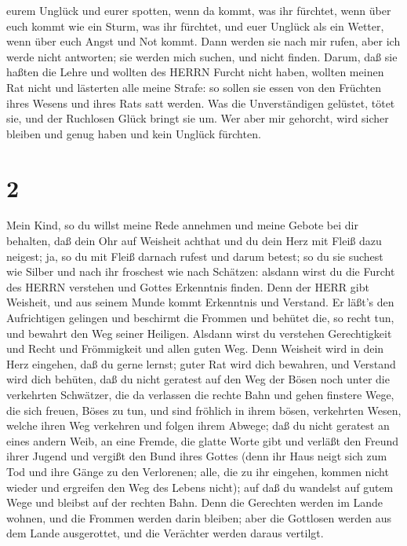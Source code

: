 eurem Unglück und eurer spotten, wenn da kommt, was ihr fürchtet,
 wenn über euch kommt wie ein Sturm, was ihr fürchtet, und
euer Unglück als ein Wetter, wenn über euch Angst und Not kommt.
 Dann werden sie nach mir rufen, aber ich werde nicht
antworten; sie werden mich suchen, und nicht finden. 
Darum, daß sie haßten die Lehre und wollten des HERRN Furcht nicht
haben,  wollten meinen Rat nicht und lästerten alle meine
Strafe:  so sollen sie essen von den Früchten ihres Wesens
und ihres Rats satt werden.  Was die Unverständigen
gelüstet, tötet sie, und der Ruchlosen Glück bringt sie um.
 Wer aber mir gehorcht, wird sicher bleiben und genug haben
und kein Unglück fürchten.

\hypertarget{section-1}{%
\section{2}\label{section-1}}

 Mein Kind, so du willst meine Rede annehmen und meine
Gebote bei dir behalten,  daß dein Ohr auf Weisheit achthat
und du dein Herz mit Fleiß dazu neigest;  ja, so du mit
Fleiß darnach rufest und darum betest;  so du sie suchest
wie Silber und nach ihr froschest wie nach Schätzen: 
alsdann wirst du die Furcht des HERRN verstehen und Gottes Erkenntnis
finden.  Denn der HERR gibt Weisheit, und aus seinem Munde
kommt Erkenntnis und Verstand.  Er läßt's den Aufrichtigen
gelingen und beschirmt die Frommen  und behütet die, so
recht tun, und bewahrt den Weg seiner Heiligen.  Alsdann
wirst du verstehen Gerechtigkeit und Recht und Frömmigkeit und allen
guten Weg.  Denn Weisheit wird in dein Herz eingehen, daß
du gerne lernst;  guter Rat wird dich bewahren, und
Verstand wird dich behüten,  daß du nicht geratest auf den
Weg der Bösen noch unter die verkehrten Schwätzer,  die da
verlassen die rechte Bahn und gehen finstere Wege,  die
sich freuen, Böses zu tun, und sind fröhlich in ihrem bösen, verkehrten
Wesen,  welche ihren Weg verkehren und folgen ihrem Abwege;
 daß du nicht geratest an eines andern Weib, an eine
Fremde, die glatte Worte gibt  und verläßt den Freund ihrer
Jugend und vergißt den Bund ihres Gottes  (denn ihr Haus
neigt sich zum Tod und ihre Gänge zu den Verlorenen;  alle,
die zu ihr eingehen, kommen nicht wieder und ergreifen den Weg des
Lebens nicht);  auf daß du wandelst auf gutem Wege und
bleibst auf der rechten Bahn.  Denn die Gerechten werden im
Lande wohnen, und die Frommen werden darin bleiben;  aber
die Gottlosen werden aus dem Lande ausgerottet, und die Verächter werden
daraus vertilgt.

